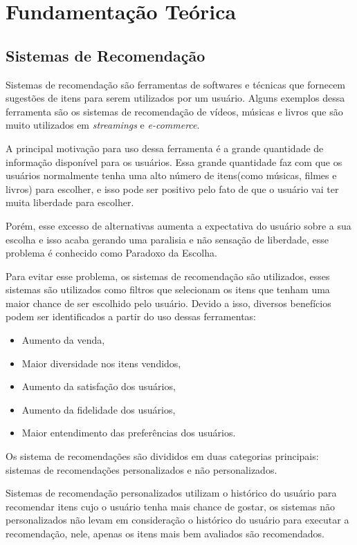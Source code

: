 \chapter{Fundamentação Teórica}\label{cap_exemplos}
\section{Sistemas de Recomendação}
Sistemas de recomendação são ferramentas de softwares e técnicas que fornecem sugestões de itens para serem utilizados por um usuário\cite{ricci2011introduction}. Alguns exemplos dessa ferramenta são os sistemas de recomendação de vídeos, músicas e livros que são muito utilizados em \textit{streamings} e \textit{e-commerce}.

A principal motivação para uso dessa ferramenta é a grande quantidade de informação disponível para os usuários. Essa grande quantidade faz com que os usuários normalmente tenha uma alto número de itens(como músicas, filmes e livros) para escolher, e isso pode ser positivo pelo fato de que o usuário vai ter muita liberdade para escolher. 

Porém, esse excesso de alternativas aumenta a expectativa do usuário sobre a sua escolha e isso acaba gerando uma paralisia e não sensação de liberdade, esse problema é conhecido como Paradoxo da Escolha\cite{schwartz2004paradox}.

Para evitar esse problema, os sistemas de recomendação são utilizados, esses sistemas são utilizados como filtros que selecionam os itens que tenham uma maior chance de ser escolhido pelo usuário. Devido a isso, diversos benefícios podem ser identificados a partir do uso dessas ferramentas:
\begin{itemize}
    \item Aumento da venda,
    \item Maior diversidade nos itens vendidos,
    \item Aumento da satisfação dos usuários,
    \item Aumento da fidelidade dos usuários,
    \item Maior entendimento das preferências dos usuários.
\end{itemize}



Os sistema de recomendações são divididos em duas categorias     principais: sistemas de recomendações personalizados e não personalizados\cite{jain2015trends}.

Sistemas de recomendação personalizados utilizam o histórico do usuário para recomendar itens cujo o usuário tenha mais chance de gostar, os sistemas não personalizados não levam em consideração o histórico do usuário para executar a recomendação, nele, apenas os itens mais bem avaliados são recomendados\cite{khatwani2016building}.

